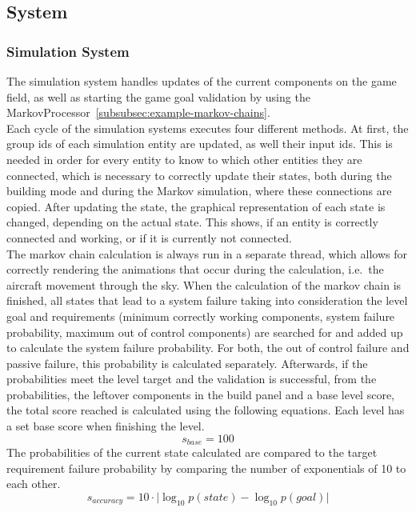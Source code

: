 \subsection{System}\label{subsec:system}
\subsubsection{Simulation System}\label{subsubsec:simulation-system}
The simulation system handles updates of the current components on the game field, as well as starting the game goal
validation by using the MarkovProcessor~\ref{subsubsec:example-markov-chains}.
\\
Each cycle of the simulation systems executes four different methods.
At first, the group ids of each simulation entity are updated, as well their input ids.
This is needed in order for every entity to know to which other entities they are connected, which is necessary to correctly
update their states, both during the building mode and during the Markov simulation, where these connections are copied.
After updating the state, the graphical representation of each state is changed, depending on the actual state.
This shows, if an entity is correctly connected and working, or if it is currently not connected.
\\
The markov chain calculation is always run in a separate thread, which allows for correctly rendering the animations that occur during the calculation, i.e.\ the aircraft movement through the sky.
When the calculation of the markov chain is finished, all states that lead to a system failure taking into consideration the level
goal and requirements (minimum correctly working components, system failure probability, maximum out of control components) are
searched for and added up to calculate the system failure probability.
For both, the out of control failure and passive failure, this probability is calculated separately.
Afterwards, if the probabilities meet the level target and the validation is successful,
from the probabilities, the leftover components in the build panel and a base level score, the total score reached is calculated using the following equations.
Each level has a set base score when finishing the level.
\begin{equation}
    s_{base} = 100
    \label{eq:base-score}
\end{equation}
The probabilities of the current state calculated are compared to the target requirement failure probability by comparing the number of exponentials of 10 to each other.
\begin{equation}
    s_{accuracy} = 10 \cdot \lvert \log_{10} p(state) - \log_{10} p(goal)\rvert
    \label{eq:accuracy-score}
\end{equation}
